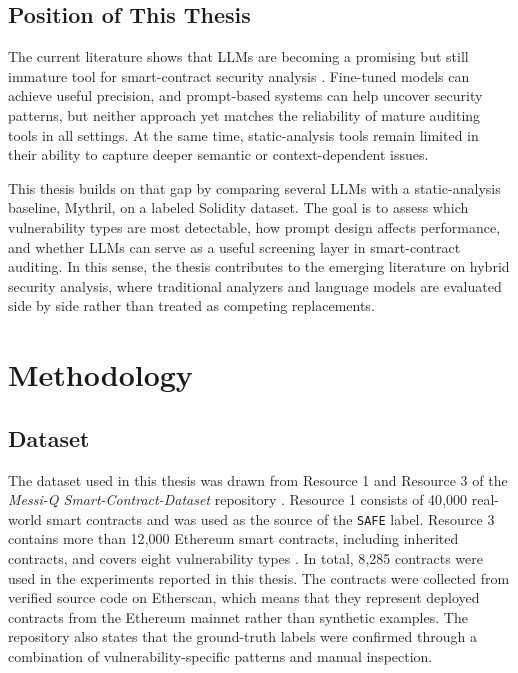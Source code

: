 \documentclass[a4paper,11pt]{article}\usepackage{graphicx} %
\begin{document}
\subsection{Position of This Thesis}

The current literature shows that LLMs are becoming a promising but still immature tool for smart-contract security analysis \cite{yang_automated_2023,zaazaa_smartllmsentry_2024,kevin_smartllm_2025,ince_generative_2025,noauthor_logic_nodate}. Fine-tuned models can achieve useful precision, and prompt-based systems can help uncover security patterns, but neither approach yet matches the reliability of mature auditing tools in all settings. At the same time, static-analysis tools remain limited in their ability to capture deeper semantic or context-dependent issues.

This thesis builds on that gap by comparing several LLMs with a static-analysis baseline, Mythril, on a labeled Solidity dataset. The goal is to assess which vulnerability types are most detectable, how prompt design affects performance, and whether LLMs can serve as a useful screening layer in smart-contract auditing. In this sense, the thesis contributes to the emerging literature on hybrid security analysis, where traditional analyzers and language models are evaluated side by side rather than treated as competing replacements.

\section{Methodology}

\subsection{Dataset}

The dataset used in this thesis was drawn from Resource 1 and Resource 3 of the \textit{Messi-Q Smart-Contract-Dataset} repository \cite{qian_messi-qsmart-contract-dataset_2026}. Resource 1 consists of 40{,}000 real-world smart contracts and was used as the source of the \texttt{SAFE} label. Resource 3 contains more than 12{,}000 Ethereum smart contracts, including inherited contracts, and covers eight vulnerability types \cite{zhuang_smart_2020,liu_rethinking_2023}. In total, 8{,}285 contracts were used in the experiments reported in this thesis. The contracts were collected from verified source code on Etherscan, which means that they represent deployed contracts from the Ethereum mainnet rather than synthetic examples. The repository also states that the ground-truth labels were confirmed through a combination of vulnerability-specific patterns and manual inspection.
\end{document}
